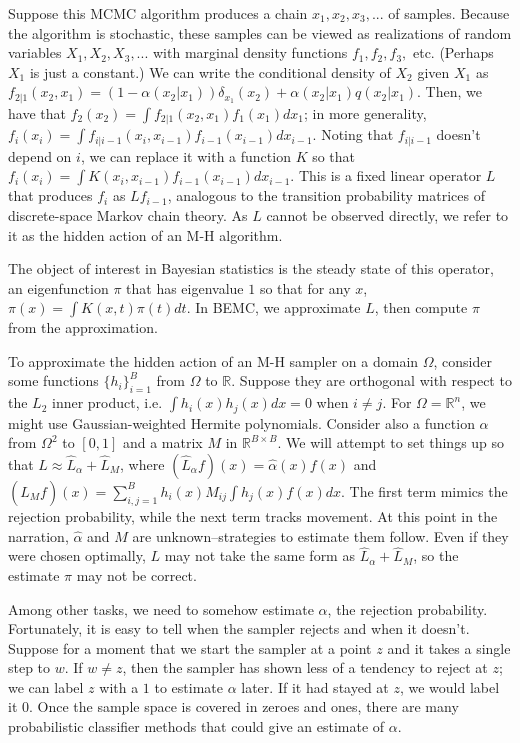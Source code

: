 \documentclass{article}
\begin{document}
Suppose this MCMC algorithm produces a chain $ x_1, x_2, x_3, ...$ of samples. Because the algorithm is stochastic, these samples can be viewed as realizations of random variables $X_1, X_2, X_3, ...$ with marginal density functions $f_1, f_2, f_3, $ etc. (Perhaps $X_1$ is just a constant.) We can write the conditional density of $X_2$ given $X_1$ as $f_{2|1}(x_2, x_1) = (1-\alpha(x_2|x_1))\delta_{x_1}(x_2) + \alpha(x_2|x_1)q(x_2|x_1)$. Then, we have that $f_2(x_2) = \int f_{2|1}(x_2, x_1)f_1(x_1)dx_1$; in more generality, $f_i(x_i) = \int f_{i|i-1}(x_i, x_{i-1})f_{i-1}(x_{i-1})dx_{i-1}$. Noting that $f_{i|i-1}$ doesn't depend on $i$, we can replace it with a function $K$ so that $f_i(x_i) = \int K(x_i, x_{i-1})f_{i-1}(x_{i-1})dx_{i-1}$. This is a fixed linear operator $L$ that produces $f_{i}$ as $Lf_{i-1}$, analogous to the transition probability matrices of discrete-space Markov chain theory. As $L$ cannot be observed directly, we refer to it as the hidden action of an M-H algorithm.

The object of interest in Bayesian statistics is the steady state of this operator, an eigenfunction $\pi$ that has eigenvalue $1$ so that for any $x$, $\pi(x) = \int K(x, t)\pi(t)dt$. In BEMC, we approximate $L$, then compute $\pi$ from the approximation. 

To approximate the hidden action of an M-H sampler on a domain $\Omega$, consider some functions $\{h_i\}_{i=1}^B$ from $\Omega$ to $\mathbb{R}$. Suppose they are orthogonal with respect to the $L_2$ inner product, i.e. $\int h_i(x)h_j(x)dx = 0$ when $i \neq j$. For $\Omega=\mathbb{R}^n$, we might use Gaussian-weighted Hermite polynomials. Consider also a function $\alpha$ from $\Omega^2$ to $[0,1]$ and a matrix $M$ in $\mathbb{R}^{B\times B}$.  We will attempt to set things up so that $L \approx \hat{L}_{\alpha}+\hat{L}_{M}$, where $ (\hat{L}_{\alpha}f)(x) = \hat{\alpha}(x)f(x)$ and $(\hat{L}_{M}f)(x) =  \sum_{i,j=1}^B h_i(x)M_{ij}\int h_j(x)f(x)dx$. The first term mimics the rejection probability, while the next term tracks movement. At this point in the narration, $\hat{\alpha}$ and $M$ are unknown--strategies to estimate them follow. Even if they were chosen optimally, $L$ may not take the same form as $\hat{L}_{\alpha}+\hat{L}_{M}$, so the estimate $\pi$ may not be correct.

Among other tasks, we need to somehow estimate $\alpha$, the rejection probability. Fortunately, it is easy to tell when the sampler rejects and when it doesn't. Suppose for a moment that we start the sampler at a point $z$ and it takes a single step to $w$. If $w \neq z$, then the sampler has shown less of a tendency to reject at $z$; we can label $z$ with a $1$ to estimate $\alpha$ later. If it had stayed at $z$, we would label it $0$. Once the sample space is covered in zeroes and ones, there are many probabilistic classifier methods that could give an estimate of $\alpha$. 
\end{document}
